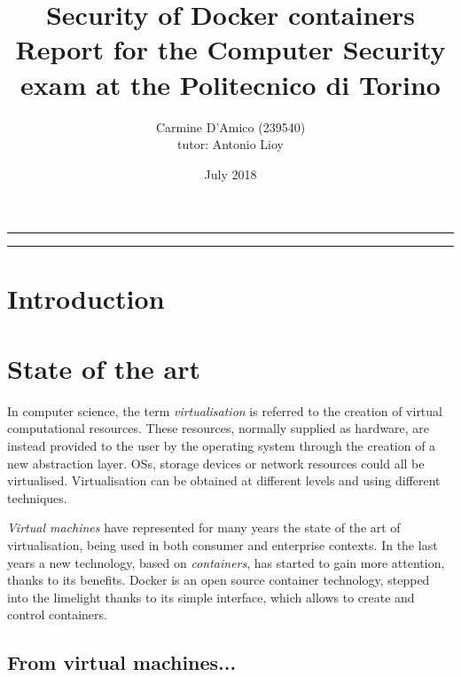 \documentclass[a4paper,12pt]{article}
\begin{document}
\title{Security of Docker containers \\
{\normalsize Report for the Computer Security exam at the Politecnico di Torino}
} \author{Carmine D'Amico (239540) \\
{\normalsize tutor: Antonio Lioy} }
\date{July 2018}
\maketitle

\vfill

\rule{\textwidth}{1pt}

\tableofcontents

\rule{\textwidth}{1pt}

\vfill

\newpage

\section{Introduction}

\newpage

\section{State of the art}

In computer science, the term \textit{virtualisation} is referred to the
creation of virtual computational resources. These resources, normally supplied
as hardware, are instead provided to the user by the operating system through
the creation of a new abstraction layer. OSs, storage devices or network
resources could all be virtualised. Virtualisation can be obtained at different
levels and using different techniques. \par\textit{Virtual machines} have
represented for many years the state of the art of virtualisation, being used in
both consumer and enterprise contexts. In the last years a new technology, based
on \textit{containers}, has started to gain more attention, thanks to its
benefits. Docker is an open source container technology, stepped into the
limelight thanks to its simple interface, which allows to create and control
containers. 

\subsection{From virtual machines...}
\end{document}
